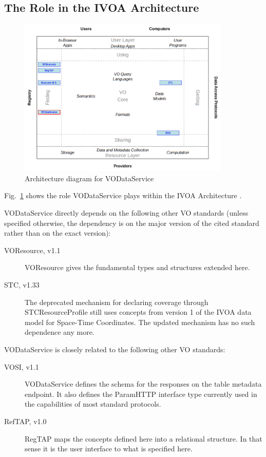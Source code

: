 \documentclass[11pt,a4paper]{ivoa}
\begin{document}
\subsection{The Role in the IVOA Architecture}

\begin{figure}
\centering
\includegraphics[width=0.9\textwidth]{role_diagram.pdf}
\caption{Architecture diagram for VODataService}
\label{fig:archdiag}
\end{figure}

Fig.~\ref{fig:archdiag} shows the role VODataService plays within the
IVOA Architecture \citep{note:VOARCH}.

VODataService directly depends on the following other VO standards
(unless specified otherwise, the dependency is on the major version of
the cited standard rather than on the exact version):

\begin{description}
\item[VOResource, v1.1 \citep{2018ivoa.spec.0625P}] VOResource gives
the fundamental types and structures extended here.
\item[STC, v1.33 \citep{2007ivoa.spec.1030R}] The deprecated mechanism
for declaring coverage through STCResourceProfile still uses concepts
from version 1 of the IVOA data model for Space-Time Coordinates.  The
updated mechanism has no such dependence any more.
\end{description}

VODataService is closely related to the following other VO standards:

\begin{description}
\item[VOSI, v1.1 \citep{2017ivoa.spec.0524G}] VODataService defines the
schema for the responses on the table metadata endpoint.  It also
defines the ParamHTTP interface type currently used in the capabilities of most
standard protocols.
\item[RefTAP, v1.0 \citep{2014ivoa.spec.1208D}] RegTAP maps the concepts
defined here into a relational structure.  In that sense it is the
user interface to what is specified here.
\end{description}
\end{document}
